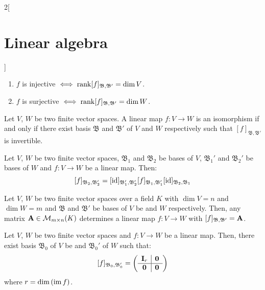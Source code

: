 \documentclass[../../../main.tex]{subfiles}
\begin{document}
\begin{multicols}{2}[\section{Linear algebra}]
\begin{corollary}
    \begin{enumerate}
      \item $f$ is injective $\iff\rank[f]_{\mathfrak{B},\mathfrak{B}'}=\dim V$.
      \item $f$ is surjective $\iff\rank[f]_{\mathfrak{B},\mathfrak{B}'}=\dim W$.
    \end{enumerate}
  \end{corollary}
  \begin{corollary}
    Let $V$, $W$ be two finite vector spaces. A linear map $f:V\rightarrow W$ is an isomorphism if and only if there exist basis $\mathfrak{B}$ and $\mathfrak{B}'$ of $V$ and $W$ respectively such that $[f]_{\mathfrak{B},\mathfrak{B}'}$ is invertible.
  \end{corollary}
  \begin{prop}
    Let $V$, $W$ be two finite vector spaces, $\mathfrak{B}_1$ and $\mathfrak{B}_2$ be bases of $V$, $\mathfrak{B}_1'$ and $\mathfrak{B}_2'$ be bases of $W$ and $f:V\rightarrow W$ be a linear map. Then: $$[f]_{\mathfrak{B}_2,\mathfrak{B}_2'}=[\mathrm{id}]_{\mathfrak{B}_1',\mathfrak{B}_2'}[f]_{\mathfrak{B}_1,\mathfrak{B}_1'}[\mathrm{id}]_{\mathfrak{B}_2,\mathfrak{B}_1}$$
  \end{prop}
  \begin{lemma}
    Let $V$, $W$ be two finite vector spaces over a field $K$ with $\dim V=n$ and $\dim W=m$ and $\mathfrak{B}$ and $\mathfrak{B}'$ be bases of $V$ be and $W$ respectively. Then, any matrix $\vb{A}\in\mathcal{M}_{m\times n}(K)$ determines a linear map $f:V\rightarrow W$ with $[f]_{\mathfrak{B},\mathfrak{B}'}=\vb{A}$.
  \end{lemma}
  \begin{theorem}
    Let $V$, $W$ be two finite vector spaces and $f:V\rightarrow W$ be a linear map. Then, there exist basis $\mathfrak{B}_0$ of $V$ be and $\mathfrak{B}_0'$ of $W$ such that:
    $$[f]_{\mathfrak{B}_0,\mathfrak{B}_0'}=\left(
      \begin{array}{c|c}
          \vb{I}_r & \vb{0} \\
          \hline
          \vb{0}   & \vb{0}
        \end{array}\right)$$
    where $r=\dim\left(\operatorname{im} f\right)$.
  \end{theorem}

\end{multicols}
\end{document}
